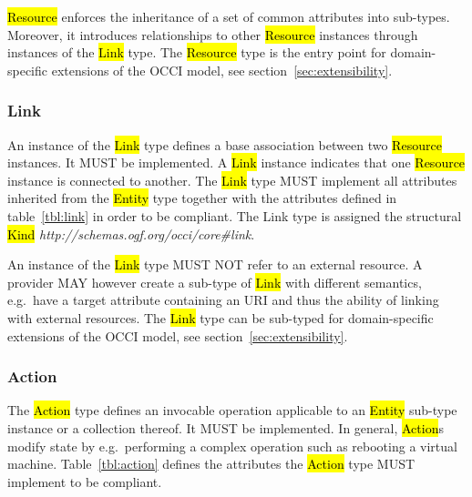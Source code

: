 \documentclass[10pt,a4paper,british]{article}
\begin{document}
\hl{Resource} enforces the inheritance of a set of common attributes into
sub-types. Moreover, it introduces relationships to other \hl{Resource}
instances through instances of the \hl{Link} type.
%
The \hl{Resource} type is the entry point for domain-specific extensions of the
OCCI model, see section~\ref{sec:extensibility}.

\subsubsection{Link}
\label{sec:link}
An instance of the \hl{Link} type defines a base association between two
\hl{Resource} instances. It MUST be implemented. A \hl{Link} instance indicates
that one \hl{Resource} instance is connected to another.
%
The \hl{Link} type MUST implement all attributes inherited from the
\hl{Entity} type together with the attributes defined in table~\ref{tbl:link}
in order to be compliant.
%
The Link type is assigned the structural \hl{Kind}
\textit{http://schemas.ogf.org/occi/core\#link}.


An instance of the \hl{Link} type MUST NOT refer to an external resource.  A
provider MAY however create a sub-type of \hl{Link} with different semantics,
e.g.~have a target attribute containing an URI and thus the ability of linking
with external resources.
%
The \hl{Link} type can be sub-typed for domain-specific extensions of the
OCCI model, see section~\ref{sec:extensibility}.

\subsubsection{Action}
The \hl{Action} type defines an invocable operation applicable to an \hl{Entity}
sub-type instance or a collection thereof. It MUST be implemented. In general,
\hl{Action}s modify state by e.g.~performing a complex operation such as
rebooting a virtual machine.
%
Table~\ref{tbl:action} defines the attributes the \hl{Action} type MUST
implement to be compliant.
\end{document}
